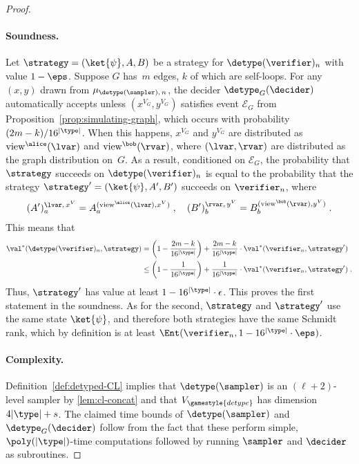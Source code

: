 \begin{proof}
\paragraph{Soundness.}
Let $\strategy = (\ket{\psi}, A, B)$ be a strategy for $\detype(\verifier)_n$
with value $1-\eps$.
Suppose $G$ has~$m$ edges, $k$ of which are self-loops.
For any $(x, y)$ drawn from $\mu_{\detype(\sampler),\, n}$, the decider
$\detype_G(\decider)$ automatically accepts unless $(x^{V_G},y^{V_G})$ satisfies
event $\mathcal{E}_G$ from Proposition~\ref{prop:simulating-graph}, which occurs
with probability $(2m-k)/16^{|\type|}$.
When this happens, $x^{V_G}$ and $y^{V_G}$ are distributed as
$\mathrm{view}^\alice(\lvar)$ and $\mathrm{view}^\bob(\rvar)$, where $(\lvar,
\rvar)$ are distributed as the graph distribution on~$G$.
As a result, conditioned on $\mathcal{E}_G$, the probability that $\strategy$
succeeds on $\detype(\verifier)_n$ is equal to the probability that the strategy
$\strategy' = (\ket{\psi}, A', B')$ succeeds on $\verifier_n$, where
\begin{equation*}
  (A')^{\lvar,\, x^V}_a = A^{(\mathrm{view}^\alice(\lvar), x^V)}_a\;, \quad
  (B')^{\rvar,\, y^V}_b = B^{(\mathrm{view}^\bob(\rvar), y^V)}_b\;.
\end{equation*}
This means that
\begin{align*}
  \val^*(\detype(\verifier)_n, \strategy)
  & = \left(1 - \frac{2m-k}{16^{|\type|}}\right) +
    \frac{2m-k}{16^{|\type|}} \cdot \val^*(\verifier_n, \strategy')\\
  & \leq \left(1 - \frac{1}{16^{|\type|}}\right) +
    \frac{1}{16^{|\type|}} \cdot \val^*(\verifier_n, \strategy')\;.
\end{align*}
Thus, $\strategy'$ has value at least $1-16^{|\type|} \cdot \epsilon$.
This proves the first statement in the soundness.
As for the second, $\strategy$ and $\strategy'$ use the same state $\ket{\psi}$,
and therefore both strategies have the same Schmidt rank, which by definition is
at least $\Ent(\verifier_n,1 - 16^{|\type|} \cdot\eps)$.

\paragraph{Complexity.}
Definition~\ref{def:detyped-CL} implies that $\detype(\sampler)$ is an
$(\ell+2)$-level sampler by \cref{lem:cl-concat} and that
$V_{\gamestyle{detype}}$ has dimension $4|\type| + s$.
The claimed time bounds of $\detype(\sampler)$ and $\detype_G(\decider)$
follow from the fact that these perform simple, $\poly(|\type|)$-time
computations followed by running $\sampler$ and $\decider$ as subroutines.
\end{proof}


 
